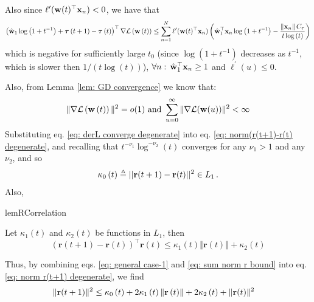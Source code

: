 \documentclass[twoside,11pt,english]{article}
\begin{document}
{Also since $\ell'(\mathbf{w}(t)^{\top}\mathbf{x}_{n})<0$, we have that 
\begin{equation}
\left(\hat{\mathbf{w}}_{1}\log\left(1+t^{-1}\right)+\boldsymbol{\tau}\left(t+1\right)-\boldsymbol{\tau}\left(t\right)\right)^\top\nabla\mathcal{L}\left(\mathbf{w}\left(t\right)\right)\le\sum_{n=1}^{N}\ell'(\mathbf{w}(t)^{\top}\mathbf{x}_{n})\left(\hat{\mathbf{w}}_{1}^{\top}\mathbf{x}_{n}\log\left(1+t^{-1}\right)-\frac{\left\Vert \mathbf{x}_{n}\right\Vert C_{\tau}}{t\log\left(t\right)}\right)
\end{equation}
which is negative for sufficiently large $t_{0}$ (since $\log\left(1+t^{-1}\right)$
decreases as $t^{-1}$, which is slower then $1/\left(t\log\left(t\right)\right)$),
$\forall n:\,\hat{\mathbf{w}}_{1}^{\top}\mathbf{x}_{n}\ge1$ and $\ell^{\prime}(u)\leq0$.

Also, from Lemma \ref{lem: GD convergence} we know that: 
\begin{equation}
\Vert\nabla\mathcal{L}\left(\mathbf{w}\left(t\right)\right)\Vert^{2}=o(1)\text{ and }\sum_{u=0}^{\infty}\Vert\nabla\mathcal{L}(\mathbf{w}(u))\Vert^{2}<\infty\label{eq: derL converge degenerate}
\end{equation}
Substituting eq. \ref{eq: derL converge degenerate} into eq. \ref{eq: norm(r(t+1)-r(t) degenerate},
and recalling that $t^{-\nu_{1}}\log^{-\nu_{2}}\left(t\right)$ converges
for any $\nu_{1}>1$ and any $\nu_{2}$, and so
\begin{equation}
\kappa_{0}\left(t\right)\triangleq||\mathbf{r}(t+1)-\mathbf{r}(t)||^{2}\in L_{1}\,.\label{eq: sum norm r bound}
\end{equation}
Also,

\begin{restatable}{lemR}{Correlation}

\label{lem: r correlation}Let $\kappa_{1}\left(t\right)$ and $\kappa_{2}\left(t\right)$
be functions in $L_{1}$, then 
\begin{equation}
\left(\mathbf{r}\left(t+1\right)-\mathbf{r}\left(t\right)\right)^{\top}\mathbf{r}\left(t\right)\leq\kappa_{1}\left(t\right)\left\Vert \mathbf{r}\left(t\right)\right\Vert +\kappa_{2}\left(t\right)\label{eq: general case-1}
\end{equation}

\end{restatable}

Thus, by combining eqs. \ref{eq: general case-1} and \ref{eq: sum norm r bound}
into eq. \ref{eq: norm r(t+1) degenerate}, we find 
\begin{align*}
\Vert\mathbf{r}(t+1)\Vert^{2} & \leq\kappa_{0}\left(t\right)+2\kappa_{1}\left(t\right)\left\Vert \mathbf{r}\left(t\right)\right\Vert +2\kappa_{2}\left(t\right)+\Vert\mathbf{r}(t)\Vert^{2}
\end{align*}

}
\end{document}
